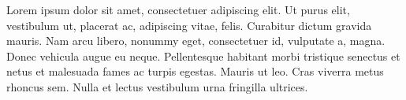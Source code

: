 \documentclass[a4paper,12pt]{scrartcl}
\begin{document}
Lorem ipsum dolor sit amet\cite{ray2017challenges}, consectetuer adipiscing elit.
Ut purus elit, vestibulum ut, placerat ac, adipiscing vitae, felis. Curabitur
dictum gravida mauris. Nam arcu libero, nonummy eget, consectetuer id, vulputate
a, magna. Donec vehicula augue eu neque. Pellentesque habitant morbi tristique
senectus et netus et malesuada fames ac turpis egestas. Mauris ut leo. Cras
viverra\cite{lemaitre1934evolution} metus rhoncus sem. Nulla et lectus vestibulum
urna fringilla ultrices.
\nocite{de1966functions}
\printbibliography
\end{document}
